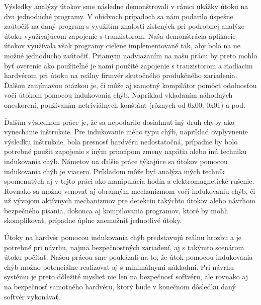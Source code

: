 Výsledky analýzy útokov sme následne demonštrovali v rámci ukážky útoku na dva jednoduché programy. V obidvoch prípadoch sa nám podarilo úspešne zaútočiť na daný program s využitím znalostí zistených pri podrobnej analýze útoku využívajúcom zapojenie s tranzistorom. Naša demonštrácia aplikácie útokov využívala však programy cielene implementované tak, aby bolo na ne možné jednoducho zaútočiť. Priamym nadviazaním na našu prácu by preto mohlo byť overenie ako použiteľné je nami použité zapojenie s tranzistorom a riadiacim hardvérom pri útoku na reálny firmvér skutočného produkčného zariadenia. Ďalšou zaujímavou otázkou je, či môže aj samotný kompilátor pomôcť odolnosťou voči útokom pomocou indukovania chýb. Napríklad vkladaním náhodných oneskorení, používaním netriviálnych konštánt (rôznych od 0x00, 0x01) a pod.

Ďalším výsledkom práce je, že sa nepodarilo dosiahnuť iný druh chyby ako vynechanie inštrukcie. Pre indukovanie iného typu chýb, napríklad ovplyvnenie výsledku inštrukcie, bola presnosť hardvéru nedostatočná, prípadne by bolo potrebné použiť zapojenie s iným princípom zmeny napätia alebo inú techniku indukovania chýb. Námetov na ďalšie práce týkajúce sa útokov pomocou indukovania chýb je viacero. Príkladom môže byť analýza iných techník spomenutých aj v tejto práci ako manipulácia hodín a elektromagnetické rušenie. Rovnako sa možno venovať aj obranným mechanizmom voči indukovaniu chýb, či už vývojom aktívnych mechanizmov pre detekciu takýchto útokov alebo návrhom bezpečného písania, dokonca aj kompilovania programov, ktoré by mohli skomplikovať, prípadne úplne znemožniť jednotlivé útoky.

Útoky na hardvér pomocou indukovania chýb predstavujú reálnu hrozbu a je potrebné pri návrhu, najmä bezpečnostných zariadení, aj s takýmto scenárom útoku počítať. Našou prácou sme poukázali na to, že útok pomocou indukovania chýb možno potenciálne realizovať aj s minimálnymi nákladmi. Pri návrhu systému je preto dôležité myslieť nie len na bezpečnosť softvéru, ale rovnako aj na bezpečnosť samotného hardvéru, ktorý bude v konečnom dôsledku daný softvér vykonávať.